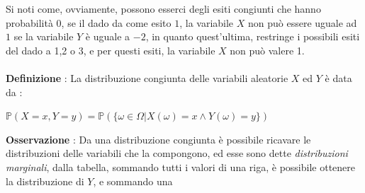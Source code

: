 \documentclass[12pt, letterpaper]{article}
\newcommand{\acc}{\\\hphantom{}\\}
\newcommand{\Prob}{{\mathbb P}}
\begin{document}
Si noti come, ovviamente, possono esserci degli esiti congiunti che hanno probabilità 0, se 
il dado da come esito \(1\), la variabile \(X\) non può essere uguale ad \(1\) se la variabile 
\(Y\) è uguale a \(-2\), in quanto quest'ultima, restringe i possibili esiti del dado a 1,2 o 3, e per
questi esiti, la variabile \(X\) non può valere 1.\acc  
\textbf{Definizione} : La distribuzione congiunta delle variabili aleatorie \(X\) ed \(Y\) è data da : \begin{center}
    \(
    \Prob(X=x,Y=y)=\Prob(\{\omega\in \Omega | X(\omega)=x\land Y(\omega)=y\})    
    \)
\end{center}
\textbf{Osservazione} : Da una distribuzione congiunta è possibile ricavare le distribuzioni delle variabili 
che la compongono, ed esse sono dette \textit{distribuzioni marginali}, dalla tabella, 
sommando tutti i valori di una riga, è possibile ottenere la distribuzione di \(Y\), e sommando una 
\end{document}
